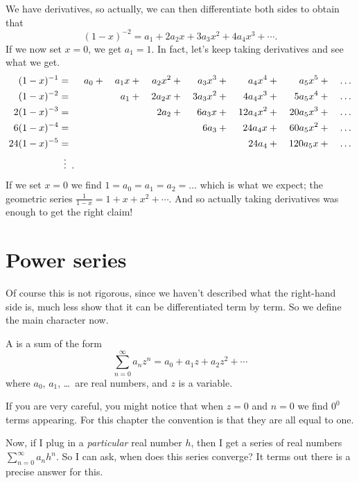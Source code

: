 We have derivatives, so actually,
we can then differentiate both sides to obtain that
\[ (1-x)^{-2} = a_1 + 2a_2 x + 3a_3 x^2 + 4a_4 x^3 + \cdots. \]
If we now set $x = 0$, we get $a_1 = 1$.
In fact, let's keep taking derivatives and see what we get.
\begin{alignat*}{8}
	(1-x)^{-1} &{}={}& a_0 &{}+{}& a_1x &{}+{}& a_2x^2 &{}+{}& a_3x^3 &{}+{}& a_4x^4  &{}+{}& a_5x^5 &{}+{}& \dots \\
	(1-x)^{-2} &{}={}& && a_1 &{}+{}& 2a_2 x &{}+{}& 3a_3 x^2 &{}+{}& 4a_4 x^3 &{}+{}& 5a_5 x^4 &{}+{}&\dots \\
	2(1-x)^{-3} &{}={}& && && 2a_2 &{}+{}& 6a_3 x &{}+{}& 12 a_4 x^2 &{}+{}& 20 a_5 x^3 &{}+{}&  \dots \\
	6(1-x)^{-4} &{}={}& &&  &&&& 6a_3 &{}+{}& 24 a_4 x &{}+{}& 60 a_5 x^2 &{}+{}& \dots \\
	24(1-x)^{-5} &{}={}& && && && && 24 a_4 &{}+{}& 120 a_5 x &{}+{}& \dots \\
	&{}\vdotswithin={}.
\end{alignat*}
If we set $x=0$ we find $1 = a_0 = a_1 = a_2 = \dots$
which is what we expect;
the geometric series $\frac{1}{1-x} = 1 + x + x^2 + \cdots$.
And so actually taking derivatives was enough to get the right claim!

\section{Power series}
Of course this is not rigorous,
since we haven't described what the right-hand side is,
much less show that it can be differentiated term by term.
So we define the main character now.

\begin{definition}
	A  is a sum of the form
	\[ \sum_{n = 0}^\infty a_n z^n
		= a_0 + a_1 z + a_2 z^2 + \cdots \]
	where $a_0$, $a_1$, \dots\ are real numbers,
	and $z$ is a variable.
\end{definition}
\begin{abuse}
	[$0^0=1$]
	If you are very careful, you might notice
	that when $z=0$ and $n=0$ we find $0^0$ terms appearing.
	For this chapter the convention is that
	they are all equal to one.
\end{abuse}

Now, if I plug in a \emph{particular} real number $h$,
then I get a series of real numbers $\sum_{n = 0}^{\infty} a_n h^n$.
So I can ask, when does this series converge?
It terms out there is a precise answer for this.

